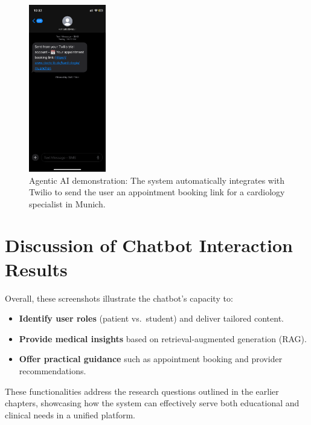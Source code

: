 \begin{figure}[H]
  \centering
  \includegraphics[width=0.3\textwidth]{Images/appointmentlink.png}
  \caption{Agentic AI demonstration: The system automatically integrates with Twilio 
    to send the user an appointment booking link for a cardiology specialist in Munich.}
  \label{fig:agentic_ai_booking}
\end{figure}

\section{Discussion of Chatbot Interaction Results}
Overall, these screenshots illustrate the chatbot’s capacity to:
\begin{itemize}
    \item \textbf{Identify user roles} (patient vs.\ student) and deliver tailored content.
    \item \textbf{Provide medical insights} based on retrieval-augmented generation (RAG).
    \item \textbf{Offer practical guidance} such as appointment booking and provider recommendations.
\end{itemize}

These functionalities address the research questions outlined in the earlier chapters, showcasing how the system can effectively serve both educational and clinical needs in a unified platform.

